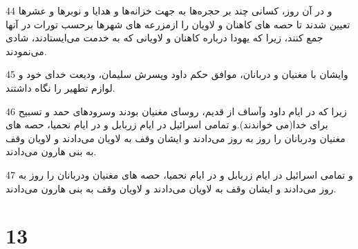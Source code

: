 \par 44 و در آن روز، کسانی چند بر حجره‌ها به جهت خزانه‌ها و هدایا و نوبرها و عشرها تعیین شدند تا حصه های کاهنان و لاویان را ازمزرعه های شهرها برحسب تورات در آنها جمع کنند، زیرا که یهودا درباره کاهنان و لاویانی که به خدمت می‌ایستادند، شادی می‌نمودند.
\par 45 وایشان با مغنیان و دربانان، موافق حکم داود وپسرش سلیمان، ودیعت خدای خود و لوازم تطهیر را نگاه داشتند.
\par 46 زیرا که در ایام داود وآساف از قدیم، روسای مغنیان بودند وسرودهای حمد و تسبیح برای خدا(می خواندند).و تمامی اسرائیل در ایام زربابل و در ایام نحمیا، حصه های مغنیان ودربانان را روز به روز می‌دادند و ایشان وقف به لاویان می‌دادند و لاویان وقف به بنی هارون می‌دادند.
\par 47 و تمامی اسرائیل در ایام زربابل و در ایام نحمیا، حصه های مغنیان ودربانان را روز به روز می‌دادند و ایشان وقف به لاویان می‌دادند و لاویان وقف به بنی هارون می‌دادند.
 
\chapter{13}

